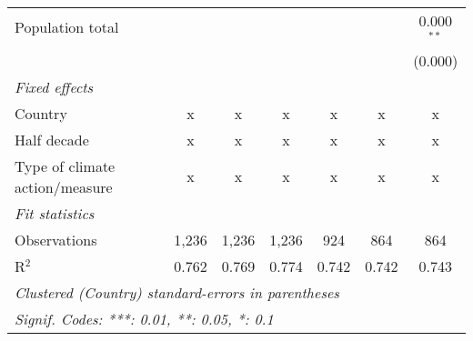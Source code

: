 \begin{tabular}{lcccccc}
   Population total                                                          &         &               &                &                &                & 0.000$^{**}$\\   
                                                                             &         &               &                &                &                & (0.000)\\   
   \emph{Fixed effects}\\
   Country                                                                   & x       & x             & x              & x              & x              & x\\  
   Half decade                                                               & x       & x             & x              & x              & x              & x\\  
   Type of climate action/measure                                            & x       & x             & x              & x              & x              & x\\  
   \midrule \emph{Fit statistics}\\
   Observations                                                              & 1,236   & 1,236         & 1,236          & 924            & 864            & 864\\  
   R$^2$                                                                     & 0.762   & 0.769         & 0.774          & 0.742          & 0.742          & 0.743\\  
   \midrule
   \multicolumn{7}{l}{\emph{Clustered (Country) standard-errors in parentheses}}\\
   \multicolumn{7}{l}{\emph{Signif. Codes: ***: 0.01, **: 0.05, *: 0.1}}\\
\end{tabular}
\par\endgroup


